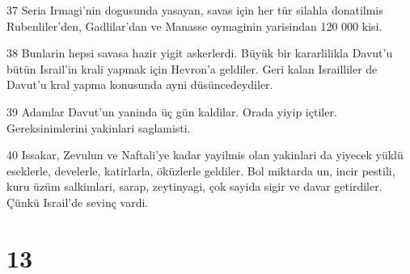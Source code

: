 \par 37 Seria Irmagi'nin dogusunda yasayan, savas için her tür silahla donatilmis Rubenliler'den, Gadlilar'dan ve Manasse oymaginin yarisindan 120 000 kisi.
\par 38 Bunlarin hepsi savasa hazir yigit askerlerdi. Büyük bir kararlilikla Davut'u bütün Israil'in krali yapmak için Hevron'a geldiler. Geri kalan Israilliler de Davut'u kral yapma konusunda ayni düsüncedeydiler.
\par 39 Adamlar Davut'un yaninda üç gün kaldilar. Orada yiyip içtiler. Gereksinimlerini yakinlari saglamisti.
\par 40 Issakar, Zevulun ve Naftali'ye kadar yayilmis olan yakinlari da yiyecek yüklü eseklerle, develerle, katirlarla, öküzlerle geldiler. Bol miktarda un, incir pestili, kuru üzüm salkimlari, sarap, zeytinyagi, çok sayida sigir ve davar getirdiler. Çünkü Israil'de sevinç vardi.

\chapter{13}

